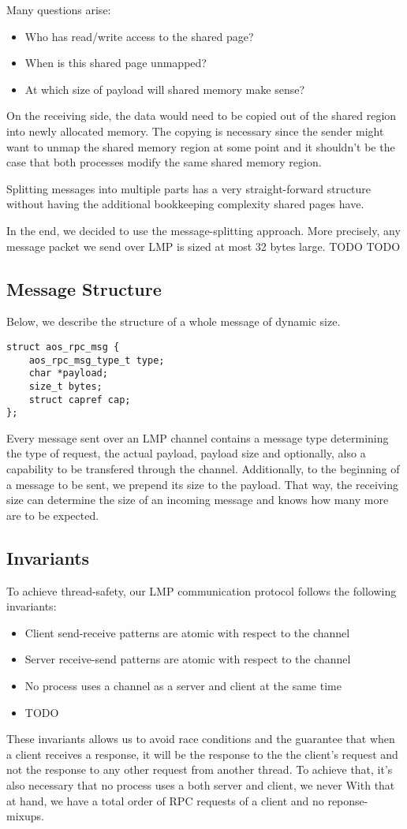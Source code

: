 Many questions arise:
\begin{itemize}
    \item Who has read/write access to the shared page? 
    \item When is this shared page unmapped?
    \item At which size of payload will shared memory make sense?
\end{itemize}
On the receiving side, the data would need to be copied out of the shared region 
into newly allocated memory. The copying is necessary since the sender 
might want to unmap the shared memory region at some point and it shouldn't be 
the case that both processes modify the same shared memory region.

Splitting messages into multiple parts has a very straight-forward structure 
without having the additional bookkeeping complexity shared pages have.


In the end, we decided to use the message-splitting approach.
More precisely, any message packet we send over LMP is sized at most 32 bytes
large.  
TODO TODO

\subsection{Message Structure}
Below, we describe the structure of a whole message of dynamic size.
\begin{verbatim}
struct aos_rpc_msg {
    aos_rpc_msg_type_t type;
    char *payload;
    size_t bytes;
    struct capref cap;
};
\end{verbatim}
Every message sent over an LMP channel contains a message type determining 
the type of request, the actual payload, payload size and optionally, 
also a capability to be transfered through the channel. 
Additionally, to the beginning of a message to be sent, we prepend its size 
to the payload. That way, the receiving size can determine the size of an 
incoming message and knows how many more are to be expected.

\subsection{Invariants}
To achieve thread-safety, our LMP communication protocol 
follows the following invariants:
\begin{itemize}
    \item Client send-receive patterns are atomic with respect to the channel
    \item Server receive-send patterns are atomic with respect to the channel
    \item No process uses a channel as a server and client at the same time
    \item TODO
\end{itemize}
These invariants allows us to avoid race conditions and the guarantee that 
when a client receives a response, it will be the response to the the client's
request and not the response to any other request from another thread.
To achieve that, it's also necessary that no process uses a both server and client, we never 
With that at hand, we have a total order of RPC requests of a client and no 
reponse-mixups.

